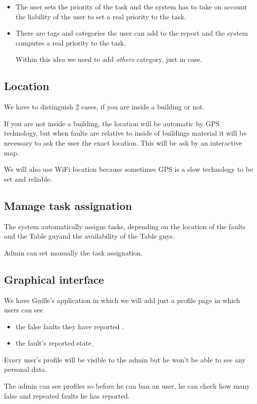\documentclass{article}
\newcommand{\tbg}{Table guy}
\newcommand{\tbgs}{Table guys}
\begin{document}
\begin{itemize}
\item The user sets the priority of the task and the system has to take on account the liability of the user to set a real priority to the task.

\item There are tags and categories the user can add to the report and the system computes a real priority to the task.

Within this idea we need to add \textit{others} category, just in case.
\end{itemize}

\subsection{Location}

We have to distinguish 2 cases, if you are inside a building or not.

If you are not inside a building, the location will be automatic by GPS technology, but when faults are relative to inside of buildings material it will be necessary to ask the user the exact location. This will be ask by an interactive map.


We will also use WiFi location because sometimes GPS is a slow technology to be set and reliable.

\subsection{Manage task assignation}
The system automatically assigns tasks, depending on the location of the faults and the \tbg and the availability of the \tbgs.

Admin can set manually the task assignation.

\subsection{Graphical interface}
We have Guille's application in which we will add just a profile page in which users can see
\begin{itemize}
\item the false faults they have reported .
\item the fault's reported state.
\end{itemize}

Every user's profile will be visible to the admin but he won't be able to see any personal data.

The admin can see profiles so before he can ban an user, he can check how many false and repeated faults he has reported.
\end{document}
